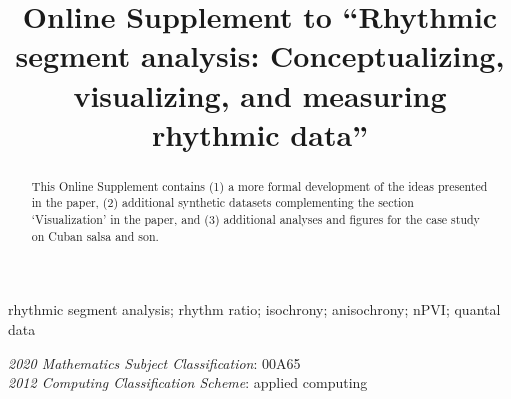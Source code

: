 \documentclass[suppldata]{tMAM2e}%
\theoremstyle{plain}
\theoremstyle{definition}
\theoremstyle{remark}
\begin{document}
  

\title{Online Supplement to ``Rhythmic segment analysis: Conceptualizing, visualizing, and measuring rhythmic data''}


\author{
%
%
\received{}
}

\maketitle


\begin{abstract}
This Online Supplement contains (1) a more formal development of the ideas presented in the paper, (2) additional synthetic datasets complementing the section `Visualization' in the paper, and (3) additional analyses and figures for the case study on Cuban salsa and son.
\end{abstract}


\begin{keywords}
rhythmic segment analysis; rhythm ratio; isochrony; anisochrony; nPVI; quantal data
\end{keywords}

\begin{classcode}\textit{2020 Mathematics Subject Classification}: 00A65 \\
\textit{2012 Computing Classification Scheme}: applied computing
\end{classcode}
\end{document}
